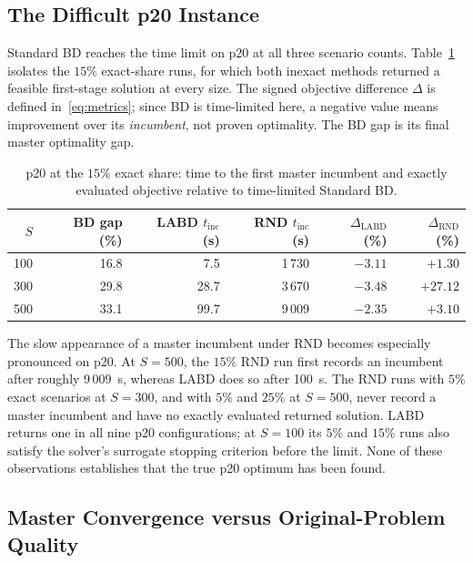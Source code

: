\subsection{The Difficult p20 Instance}\label{app:trace-p20}

Standard BD reaches the time limit on p20 at all three scenario counts. Table~\ref{tab:trace-p20} isolates the $15\%$ exact-share runs, for which both inexact methods returned a feasible first-stage solution at every size. The signed objective difference $\Delta$ is defined in~\eqref{eq:metrics}; since BD is time-limited here, a negative value means improvement over its \emph{incumbent}, not proven optimality. The BD gap is its final master optimality gap.

\begin{table}[ht]
\centering
\caption{p20 at the $15\%$ exact share: time to the first master incumbent and exactly evaluated objective relative to time-limited Standard BD.}
\label{tab:trace-p20}
\scriptsize
\setlength{\tabcolsep}{4pt}
\begin{tabular}{r r r r r r}
\toprule
$S$ & BD gap (\%) & LABD $t_{\mathrm{inc}}$ (s) & RND $t_{\mathrm{inc}}$ (s) & $\Delta_{\mathrm{LABD}}$ (\%) & $\Delta_{\mathrm{RND}}$ (\%)\\
\midrule
100 & 16.8 & 7.5  & 1\,730 & $-3.11$ & $+1.30$\\
300 & 29.8 & 28.7 & 3\,670 & $-3.48$ & $+27.12$\\
500 & 33.1 & 99.7 & 9\,009 & $-2.35$ & $+3.10$\\
\bottomrule
\end{tabular}
\end{table}

The slow appearance of a master incumbent under RND becomes especially pronounced on p20. At $S=500$, the $15\%$ RND run first records an incumbent after roughly 9\,009~s, whereas LABD does so after 100~s. The RND runs with $5\%$ exact scenarios at $S=300$, and with $5\%$ and $25\%$ at $S=500$, never record a master incumbent and have no exactly evaluated returned solution. LABD returns one in all nine p20 configurations; at $S=100$ its $5\%$ and $15\%$ runs also satisfy the solver's surrogate stopping criterion before the limit. None of these observations establishes that the true p20 optimum has been found.

\subsection{Master Convergence versus Original-Problem Quality}\label{app:trace-gaps}


